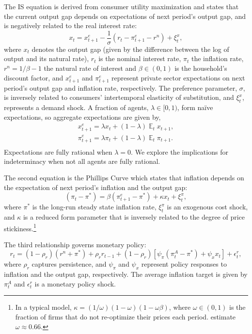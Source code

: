 \documentclass[english,authoryear,12pt]{elsarticle}
\DeclareMathOperator{\E}{\mathbb{E}}
\begin{document}
The IS equation is derived from consumer utility maximization and states that the current output gap depends on expectations of next period's output gap, and is negatively related to the real interest rate:
\begin{equation}\label{eq:ISe}
	x_t = x_{t+1}^e - \frac{1}{\sigma} \left( r_t - \pi_{t+1}^e  - r^n  \right) + \xi_t^{x},
\end{equation}
where $x_t$ denotes the output gap (given by the difference between the log of output and its natural rate), $r_t$ is the nominal interest rate, $\pi_t$ the inflation rate, $r^n = 1/\beta - 1$ the natural rate of interest and $\beta \in (0,1)$ is the household's discount factor, and $x_{t+1}^e$ and $\pi_{t+1}^e$ represent private sector expectations on next period's output gap and inflation rate, respectively. The preference parameter, $\sigma$, is inversely related to consumers' intertemporal elasticity of substitution, and $\xi_t^x$, represents a demand shock. A fraction of agents, $\lambda\in[0,1)$, form na\"ive expectations, so aggregate expectations are given by,
\begin{equation}
	\begin{array}{c}
		x_{t+1}^e = \lambda x_t + (1-\lambda) \E_t x_{t+1}, \\ [1.5pc]
		\pi_{t+1}^e = \lambda \pi_t + (1-\lambda) \E_t \pi_{t+1}. \\
	\end{array}
\end{equation}
Expectations are fully rational when $\lambda=0$. We explore the implications for indeterminacy when not all agents are fully rational.

The second equation is the Phillips Curve which states that inflation depends on the expectation of next period's inflation and the output gap:
\begin{equation}\label{eq:PhillipsCurvee}
	(\pi_t - \pi^*) = \beta (\pi_{t+1}^e - \pi^*) + \kappa x_t + \xi_t^{\pi},
\end{equation}
where $\pi^*$ is the long-run steady state inflation rate, $\xi_t^\pi$ is an exogenous cost shock, and $\kappa$ is a reduced form parameter that is inversely related to the degree of price stickiness.\footnote{In a typical model, $\kappa=(1/\omega)(1-\omega)(1-\omega\beta)$, where $\omega \in (0,1)$ is the fraction of firms that do not re-optimize their prices each period. \citet{smetswouters2007} estimate $\omega \approx 0.66$.}

The third relationship governs monetary policy:
\begin{equation}\label{eq:TaylorRule}
	r_t = (1-\rho_r)(r^n + \pi^*) + \rho_r r_{t-1} + (1-\rho_r) \left[ \psi_\pi (\pi_t^A - \pi^*) + \psi_x x_t \right] + \epsilon_t^{r},
\end{equation}
where $\rho_r$ captures persistence, and $\psi_\pi$ and $\psi_x$ represent policy responses to inflation and the output gap, respectively. The average inflation target is given by $\pi_t^A$ and $\epsilon_t^r$ is a monetary policy shock.
\end{document}
